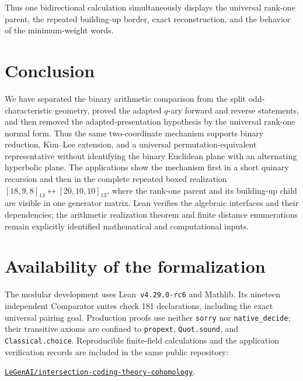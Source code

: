 \documentclass[12pt]{article}
\begin{document}
Thus one bidirectional calculation simultaneously displays the universal
rank-one parent, the repeated building-up border, exact reconstruction, and
the behavior of the minimum-weight words.
\section{Conclusion}
\label{sec:conclusion}

We have separated the binary arithmetic comparison from the split
odd-characteristic geometry, proved the adapted \(q\)-ary forward and reverse
statements, and then removed the adapted-presentation hypothesis by the
universal rank-one normal form.  Thus the same two-coordinate mechanism
supports binary reduction, Kim--Lee extension, and a universal
permutation-equivalent representative without identifying the binary
Euclidean plane with an alternating hyperbolic plane.  The applications show
the mechanism first in a short quinary recursion and then in the complete
repeated boxed realization
\([18,9,8]_{13}\leftrightarrow[20,10,10]_{13}\), where the rank-one parent
and its building-up child are visible in one generator matrix.  Lean verifies
the algebraic interfaces and their dependencies; the arithmetic realization
theorem and finite distance enumerations remain explicitly identified
mathematical and computational inputs.


\section*{Availability of the formalization}

The modular development uses Lean~\texttt{v4.29.0-rc6} and Mathlib.  Its
nineteen independent Comparator suites check 181 declarations, including
the exact universal pairing goal.  Production proofs use neither
\texttt{sorry} nor \texttt{native\_decide}; their transitive axioms are
confined to \texttt{propext}, \texttt{Quot.sound}, and
\texttt{Classical.choice}.  Reproducible finite-field calculations and the
application verification records are included in the same public repository:
\begin{center}
\href{https://github.com/LeGenAI/intersection-coding-theory-cohomology}
{\texttt{LeGenAI/intersection-coding-theory-cohomology}}.
\end{center}
\end{document}
